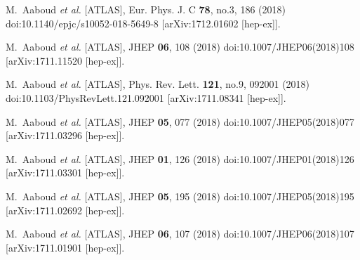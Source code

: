 \begin{thebibliography}{9}
M.~Aaboud \textit{et al.} [ATLAS],
Eur. Phys. J. C \textbf{78}, no.3, 186 (2018)
doi:10.1140/epjc/s10052-018-5649-8
[arXiv:1712.01602 [hep-ex]].

M.~Aaboud \textit{et al.} [ATLAS],
JHEP \textbf{06}, 108 (2018)
doi:10.1007/JHEP06(2018)108
[arXiv:1711.11520 [hep-ex]].

M.~Aaboud \textit{et al.} [ATLAS],
Phys. Rev. Lett. \textbf{121}, no.9, 092001 (2018)
doi:10.1103/PhysRevLett.121.092001
[arXiv:1711.08341 [hep-ex]].

M.~Aaboud \textit{et al.} [ATLAS],
JHEP \textbf{05}, 077 (2018)
doi:10.1007/JHEP05(2018)077
[arXiv:1711.03296 [hep-ex]].

M.~Aaboud \textit{et al.} [ATLAS],
JHEP \textbf{01}, 126 (2018)
doi:10.1007/JHEP01(2018)126
[arXiv:1711.03301 [hep-ex]].

M.~Aaboud \textit{et al.} [ATLAS],
JHEP \textbf{05}, 195 (2018)
doi:10.1007/JHEP05(2018)195
[arXiv:1711.02692 [hep-ex]].

M.~Aaboud \textit{et al.} [ATLAS],
JHEP \textbf{06}, 107 (2018)
doi:10.1007/JHEP06(2018)107
[arXiv:1711.01901 [hep-ex]].


\end{thebibliography}

